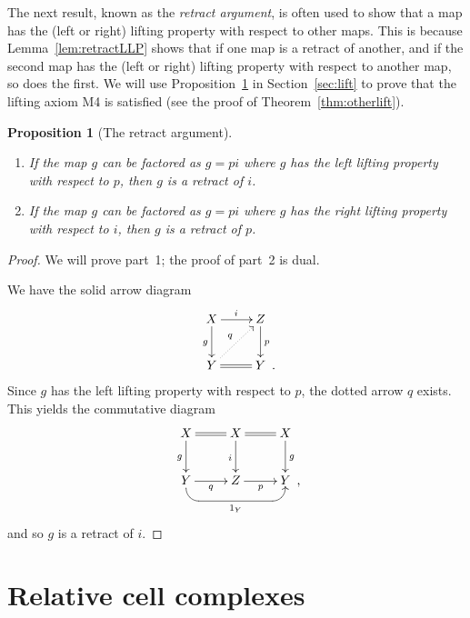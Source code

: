 \documentclass{amsart}
\numberwithin{equation}{section}
\theoremstyle{slplain}
\newtheorem{prop}[equation]{Proposition}
\theoremstyle{definition}
\theoremstyle{remark}
\newcommand{\thmref}{Theorem~\ref}
\newcommand{\propref}{Proposition~\ref}
\newcommand{\lemref}{Lemma~\ref}
\newcommand{\secref}{Section~\ref}
\newcommand{\Comma}{\rlap{\enspace ,}}
\newcommand{\Period}{\rlap{\enspace .}}
\begin{document}
The next result, known as the \emph{retract argument}, is often used
to show that a map has the (left or right) lifting property with
respect to other maps.  This is because \lemref{lem:retractLLP} shows
that if one map is a retract of another, and if the second map has the
(left or right) lifting property with respect to another map, so does
the first.  We will use \propref{prop:RetArg} in \secref{sec:lift} to
prove that the lifting axiom M4 is satisfied (see the proof of
\thmref{thm:otherlift}).
\begin{prop}[The retract argument]
  \label{prop:RetArg}
\leavevmode
  \begin{enumerate}
  \item If the map $g$ can be factored as $g = pi$ where $g$ has the
    left lifting property with respect to $p$, then $g$ is a retract
    of $i$.
  \item If the map $g$ can be factored as $g = pi$ where $g$ has the
    right lifting property with respect to $i$, then $g$ is a retract
    of $p$.
  \end{enumerate}
\end{prop}

\begin{proof}
  We will prove part~1; the proof of part~2 is dual.

  We have the solid arrow diagram
  \begin{displaymath}
    \xymatrix{
      {X} \ar[r]^{i} \ar[d]_{g}
        & {Z} \ar[d]^{p}\\
      {Y} \ar@{.>}[ur]^{q} \ar@{=}[r]
        & {Y \Period}
    }
  \end{displaymath}
  Since $g$ has the left lifting property with respect to $p$, the
  dotted arrow $q$ exists.  This yields the commutative diagram
  \begin{displaymath}
    \xymatrix{
      {X} \ar@{=}[r] \ar[d]_{g}
        & {X} \ar@{=}[r] \ar[d]_{i}
        & {X} \ar[d]^{g}\\
        {Y} \ar[r]_{q} \ar `d[rr] `[urr]_{1_{Y}} [rr]+<0ex,-1ex>
        & {Z} \ar[r]_{p}
        & {Y \smash{\Comma}}
    }
  \end{displaymath}
  and so $g$ is a retract of $i$.
\end{proof}

\section{Relative cell complexes}
\label{sec:RelClCmp}
\end{document}
